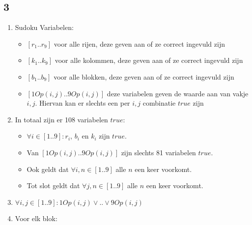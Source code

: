 \documentclass[]{article}
\begin{document}
  \subsection*{3}
  \begin{enumerate}[a]
    \item Sudoku Variabelen:
    \begin{itemize}
      \item $ [r_1 .. r_9] $ voor alle rijen, deze geven aan of ze correct ingevuld zijn
      \item $ [k_1 .. k_9] $ voor alle kolommen, deze geven aan of ze correct ingevuld zijn
      \item $ [b_1 .. b_9] $ voor alle blokken, deze geven aan of ze correct ingevuld zijn
      \item $ [1Op(i,j) .. 9Op(i,j)] $ deze variabelen geven de waarde aan van vakje $i,j$. Hiervan kan er slechts een per $i,j$ combinatie $true$ zijn
    \end{itemize}
    \item In totaal zijn er 108 variabelen $true$:
    \begin{itemize}
      \item $ \forall i \in [1..9] : r_i $, $b_i$ en $k_i$ zijn $true$.
      \item Van $ [1Op(i,j) .. 9Op(i,j)] $ zijn slechts 81 variabelen $true$.
      \item Ook geldt dat $\forall i,n \in [1..9]$ alle $n$ een keer voorkomt.
      \item Tot slot geldt dat $\forall j,n \in [1..9]$ alle $n$ een keer voorkomt.
    \end{itemize}
    \item $\forall i,j \in [1..9]: 1Op(i,j) \lor .. \lor 9Op(i,j) $
    \item Voor elk blok: $  $
  \end{enumerate}
\end{document}
